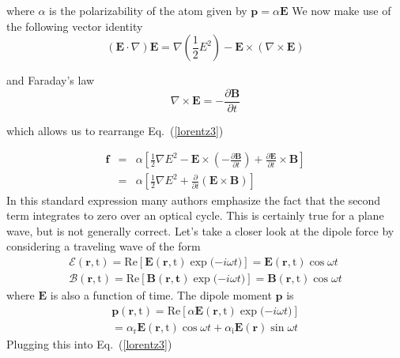 where $\alpha$ is the polarizability of the atom given by $\mathbf{p}=\alpha\mathbf{E}$ We now make use of the following vector identity
\begin{equation}
\left(\mathbf{E}\cdot\nabla\right)\mathbf{E}=\nabla\left(\frac{1}{2}E^2\right)-\mathbf{E}\times\left(\nabla\times\mathbf{E}\right)
\label{vectorid}
\end{equation}

and Faraday's law
\begin{equation}
\nabla\times\mathbf{E}=-\frac{\partial\mathbf{B}}{\partial t}
\label{faraday}
\end{equation}

which allows us to rearrange Eq.\ (\ref{lorentz3})

\begin{eqnarray}
\mathbf{f} &=& \alpha\left[\frac{1}{2}\nabla E^2-\mathbf{E}\times\left(-\frac{\partial\mathbf{B}}{\partial t}\right)+\frac{\partial\mathbf{E}}{\partial t}\times\mathbf{B}\right] \nonumber \\
 &=& \alpha\left[\frac{1}{2}\nabla E^2+\frac{\partial}{\partial t}\left(\mathbf{E}\times\mathbf{B}\right)\right]
\label{lorentz4}
\end{eqnarray}
In this standard expression \cite{Berry,hinds09,loudon3} many authors emphasize the fact that the second term integrates to zero over an optical cycle.  This is certainly true for a plane wave, but is not generally correct. Let's take a closer look at the dipole force by considering a traveling wave of the form
\begin{align}
&\mathbf{\mathcal{E}}(\mathbf{r},\mathrm{t})=\mathrm{Re}\left[\mathbf{E}(\mathbf{r},\mathrm{t})\exp{(-i\omega t})\right]=\mathbf{E}(\mathbf{r},\mathrm{t})\cos{\omega t}& \nonumber \\
&\mathbf{\mathcal{B}}(\mathbf{r},\mathrm{t})=\mathrm{Re}\left[\mathbf{B}(\mathbf{r},\mathbf{t})\exp{(-i\omega t})\right]=\mathbf{B}(\mathbf{r},\mathrm{t})\cos{\omega t}&
\label{fields2}
\end{align}
where $\mathbf{E}$ is also a function of time.  The dipole moment $\mathbf{p}$ is
\begin{align}
&\mathbf{p}(\mathbf{r},\mathrm{t})=\mathrm{Re}\left[\alpha\mathbf{E}(\mathbf{r},\mathrm{t})\exp{(-i\omega t})\right]& \nonumber \\
&=\alpha_{\mathrm{r}}\mathbf{E}(\mathbf{r},\mathrm{t})\cos{\omega t} + \alpha_{\mathrm{i}}\mathbf{E}(\mathbf{r})\sin{\omega t}&
\label{dipole2}
\end{align}
Plugging this into Eq.\ (\ref{lorentz3})
